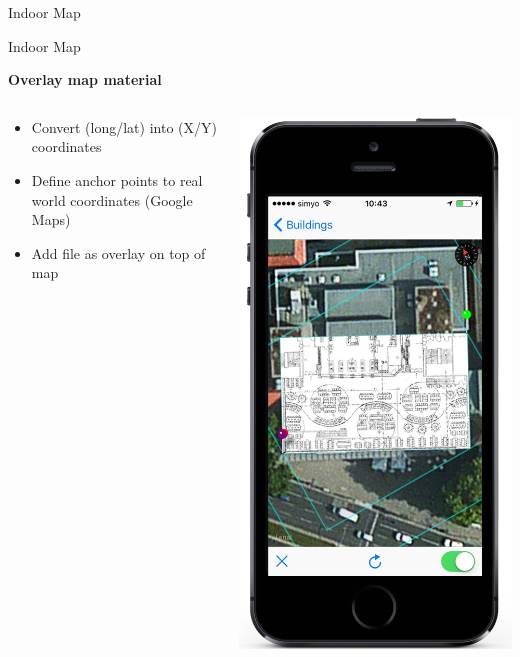 \documentclass[11pt]{beamer}
\begin{document}
\begin{frame}{Indoor Map}
\end{frame}


\begin{frame}{Indoor Map}

\textbf{Overlay map material}

  \begin{columns}[T]
  \begin{column}{.6\textwidth}
  \begin{itemize}
    \item Convert (long/lat) into (X/Y) coordinates
    \item Define anchor points to real world coordinates (Google Maps)
    \item Add file as overlay on top of map
  \end{itemize}
  \end{column}
  \begin{column}{.4\textwidth}
  \includegraphics[scale=0.25]{mapsecondstep}

\end{column}
\end{columns}
\end{frame}
\end{document}
